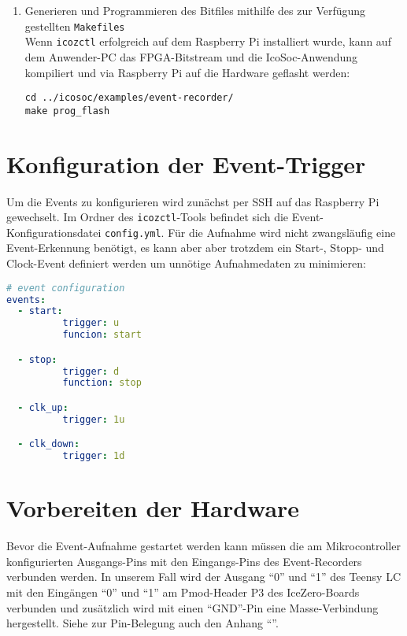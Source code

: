 \begin{enumerate}
\item Generieren und Programmieren des Bitfiles mithilfe des zur Verfügung gestellten {\tt Makefiles}\\
Wenn {\tt icozctl} erfolgreich auf dem Raspberry Pi installiert wurde, kann auf dem Anwender-PC das FPGA-Bitstream und die 
IcoSoc-Anwendung kompiliert und via Raspberry Pi auf die Hardware geflasht werden:
\begin{verbatim}
cd ../icosoc/examples/event-recorder/
make prog_flash
\end{verbatim}

 
\end{enumerate}

\section{Konfiguration der Event-Trigger}
\label{ch:Anwendungsfall:sec:Event-Trigger}

Um die Events zu konfigurieren wird zunächst per SSH auf das Raspberry Pi gewechselt.  
Im Ordner des {\tt icozctl}-Tools befindet sich die Event-Konfigurationsdatei {\tt config.yml}.
Für die Aufnahme wird nicht zwangsläufig eine Event-Erkennung benötigt, es kann aber aber trotzdem ein Start-, Stopp- und Clock-Event definiert werden um unnötige Aufnahmedaten zu minimieren:

\begin{lstlisting}[language=yaml]
# event configuration
events: 
  - start:
          trigger: u
          funcion: start

  - stop:
          trigger: d
          function: stop

  - clk_up:
          trigger: 1u

  - clk_down:
          trigger: 1d
\end{lstlisting}

\section{Vorbereiten der Hardware}
\label{ch:Anwendungsfall:sec:Vorbereitung}

Bevor die Event-Aufnahme gestartet werden kann müssen die am Mikrocontroller konfigurierten Ausgangs-Pins mit den Eingangs-Pins des Event-Recorders verbunden werden.
In unserem Fall wird der Ausgang ``0'' und ``1'' des Teensy LC mit den Eingängen ``0'' und ``1'' am Pmod-Header P3 des IceZero-Boards verbunden und zusätzlich wird mit einen ``GND''-Pin eine Masse-Verbindung hergestellt. Siehe zur Pin-Belegung auch den Anhang ``''. 

